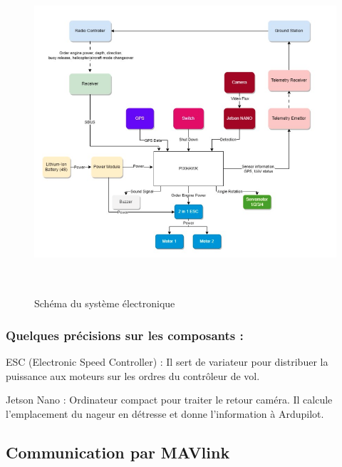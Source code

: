\documentclass[a4paper,12pt,french]{report}
\begin{document}
\begin{figure}[h]
    \centering
    \includegraphics[height=12cm]{figures/elec.png}
    \caption{Schéma du système électronique}
\end{figure}

\subsubsection{Quelques précisions sur les composants :}

ESC (Electronic Speed Controller) : Il sert de variateur pour distribuer la puissance aux moteurs sur les ordres du contrôleur de vol.\newline

Jetson Nano : Ordinateur compact pour traiter le retour caméra. Il calcule l’emplacement du nageur en détresse et donne l’information à Ardupilot.
\newpage
\subsection{Communication par MAVlink}
\end{document}
